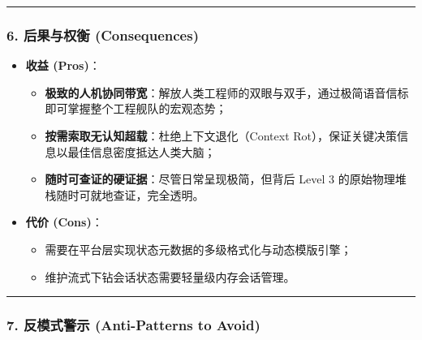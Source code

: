 \documentclass[
]{ctexart}
\providecommand{\tightlist}{%
  \setlength{\itemsep}{0pt}\setlength{\parskip}{0pt}}
\renewcommand{\_}{\discretionary{}{}{\textunderscore}}
\begin{document}
\begin{center}\rule{0.5\linewidth}{0.5pt}\end{center}

\subsubsection{6. 后果与权衡
(Consequences)}\label{ux540eux679cux4e0eux6743ux8861-consequences-15}

\begin{itemize}
\tightlist
\item
  \textbf{收益 (Pros)}：

  \begin{itemize}
  \tightlist
  \item
    \textbf{极致的人机协同带宽}：解放人类工程师的双眼与双手，通过极简语音信标即可掌握整个工程舰队的宏观态势；
  \item
    \textbf{按需索取无认知超载}：杜绝上下文退化（Context
    Rot），保证关键决策信息以最佳信息密度抵达人类大脑；
  \item
    \textbf{随时可查证的硬证据}：尽管日常呈现极简，但背后 Level 3
    的原始物理堆栈随时可就地查证，完全透明。
  \end{itemize}
\item
  \textbf{代价 (Cons)}：

  \begin{itemize}
  \tightlist
  \item
    需要在平台层实现状态元数据的多级格式化与动态模版引擎；
  \item
    维护流式下钻会话状态需要轻量级内存会话管理。
  \end{itemize}
\end{itemize}

\begin{center}\rule{0.5\linewidth}{0.5pt}\end{center}

\subsubsection{7. 反模式警示 (Anti-Patterns to
Avoid)}\label{ux53cdux6a21ux5f0fux8b66ux793a-anti-patterns-to-avoid-15}
\end{document}
